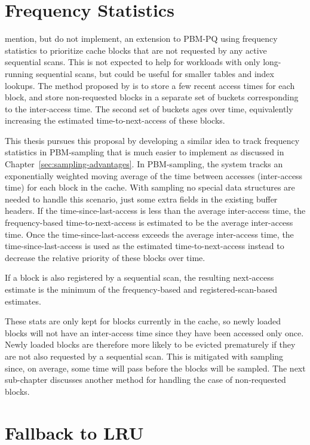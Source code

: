 \section{\label{sec:frequency-stats}Frequency Statistics}

\citet{pbm} mention, but do not implement, an extension to PBM-PQ using frequency statistics to prioritize cache blocks that are not requested by any active sequential scans. This is not expected to help for workloads with only long-running sequential scans, but could be useful for smaller tables and index lookups. The method proposed by \citet{pbm} is to store a few recent access times for each block, and store non-requested blocks in a separate set of buckets corresponding to the inter-access time. The second set of buckets ages over time, equivalently increasing the estimated time-to-next-access of these blocks.

This thesis pursues this proposal by developing a similar idea to track frequency statistics in PBM-sampling that is much easier to implement as discussed in Chapter~\ref{sec:sampling-advantages}. In PBM-sampling, the system tracks an exponentially weighted moving average of the time between accesses (inter-access time) for each block in the cache. With sampling no special data structures are needed to handle this scenario, just some extra fields in the existing buffer headers. If the time-since-last-access is less than the average inter-access time, the frequency-based time-to-next-access is estimated to be the average inter-access time. Once the time-since-last-access exceeds the average inter-access time, the time-since-last-access is used as the estimated time-to-next-access instead to decrease the relative priority of these blocks over time. 

If a block is also registered by a sequential scan, the resulting next-access estimate is the minimum of the frequency-based and registered-scan-based estimates.

These stats are only kept for blocks currently in the cache, so newly loaded blocks will not have an inter-access time since they have been accessed only once. Newly loaded blocks are therefore more likely to be evicted prematurely if they are not also requested by a sequential scan. This is mitigated with sampling since, on average, some time will pass before the blocks will be sampled. The next sub-chapter discusses another method for handling the case of non-requested blocks.

\section{\label{sec:lru_nr}Fallback to LRU}



